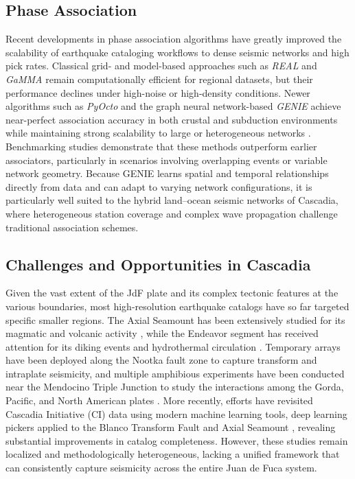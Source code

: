 \documentclass[review]{seismica}
\begin{document}
\subsection{Phase Association}\label{phase-association}

Recent developments in phase association algorithms have greatly
improved the scalability of earthquake cataloging workflows to dense
seismic networks and high pick rates. Classical grid- and model-based
approaches such as \emph{REAL} and \emph{GaMMA} remain computationally
efficient for regional datasets, but their performance declines under
high-noise or high-density conditions. Newer algorithms such as
\emph{PyOcto} and the graph neural network-based \emph{GENIE} achieve
near-perfect association accuracy in both crustal and subduction
environments while maintaining strong scalability to large or
heterogeneous networks \citep{Puente2025}. Benchmarking studies
demonstrate that these methods outperform earlier associators,
particularly in scenarios involving overlapping events or variable
network geometry. Because GENIE learns spatial and temporal
relationships directly from data and can adapt to varying network
configurations, it is particularly well suited to the hybrid land--ocean
seismic networks of Cascadia, where heterogeneous station coverage and
complex wave propagation challenge traditional association schemes.

\subsection{Challenges and Opportunities in
Cascadia}\label{challenges-and-opportunities-in-cascadia}

Given the vast extent of the JdF plate and its complex tectonic features
at the various boundaries, most high-resolution earthquake catalogs have
so far targeted specific smaller regions. The Axial Seamount has been
extensively studied for its magmatic and volcanic activity
\citep[e.g.,][]{Wilcock2016, Waldhauser2020}, while the Endeavor segment
has received attention for its diking events and hydrothermal
circulation \citep[e.g.,][]{Krauss2019}. Temporary arrays have been
deployed along the Nootka fault zone to capture transform and intraplate
seismicity, and multiple amphibious experiments have been conducted near
the Mendocino Triple Junction to study the interactions among the Gorda,
Pacific, and North American plates \citep[e.g.,][]{Yoon2024}. More
recently, efforts have revisited Cascadia Initiative (CI) data using
modern machine learning tools, deep learning pickers applied to the
Blanco Transform Fault \citep{liu25} and Axial Seamount \citep{wang},
revealing substantial improvements in catalog completeness. However,
these studies remain localized and methodologically heterogeneous,
lacking a unified framework that can consistently capture seismicity
across the entire Juan de Fuca system.
\end{document}
